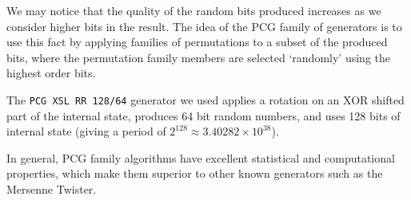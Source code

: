 \documentclass[10pt, a4paper]{article}
\begin{document}
We may notice that the quality of the random bits produced increases as we consider higher bits
in the result\cite{pcg}. The idea of the PCG family of generators is to use this fact by
applying families of permutations to a subset of the produced bits, where the permutation family
members are selected `randomly' using the highest order bits.

The \texttt{PCG XSL RR 128/64} generator we used applies a rotation on an XOR shifted part of the
internal state, produces 64 bit random numbers, and uses 128 bits of internal state (giving a
period of $2^{128} \approx 3.40282\times10^{38}$)\cite{pcg}.

In general, PCG family algorithms have excellent statistical and computational properties, which
make them superior to other known generators such as the Mersenne Twister\cite{pcg}.
\end{document}
